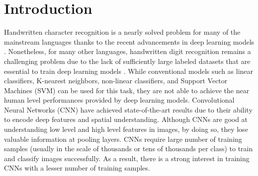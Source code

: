 \section{Introduction}
\label{sect:intro}



Handwritten character recognition is a nearly solved problem for many of the mainstream languages thanks to the recent advancements in deep learning models \cite{cirecsan2010deep}. Nonetheless, for many other languages, handwritten digit recognition remains a challenging problem due to the lack of sufficiently large labeled datasets that are essential to train deep learning models \cite{Krizhevsky:2012:ICD:2999134.2999257}. While conventional models such as linear classifiers, K-nearest neighbors, non-linear classifiers, and Support Vector Machines (SVM)  \cite{lee1991handwritten} can be used for this task, they are not able to achieve the near human level performances provided by deep learning models. Convolutional Neural Networks (CNN) have achieved state-of-the-art results due to their ability to encode deep features and spatial understanding. Although CNNs are good at understanding low level and high level features in images, by doing so, they lose valuable information at pooling layers. CNNs require large number of training samples (usually in the scale of thousands or tens of thousands per class) to train and classify images successfully. As a result, there is a strong interest in training CNNs with a lesser number of training samples.

